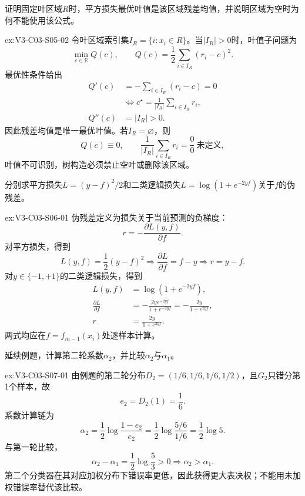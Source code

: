 \begin{SLChapterExercisePairSection}
\begin{exercise}\label{ex:V3-C03-S05-02}
证明固定叶区域$R$时，平方损失最优叶值是该区域残差均值，并说明区域为空时为何不能使用该公式。
\end{exercise}
\ifSLFullEdition
{}\label{sol:V3-C03-S05-02}
\begin{chapterexercisesolution}{ex:V3-C03-S05-02}
令叶区域索引集$I_R=\{i:x_i\in R\}$。当$|I_R|>0$时，叶值子问题为
\[
\min_{c\in\mathbb R}Q(c),
\qquad
Q(c)=\frac12\sum_{i\in I_R}(r_i-c)^2.
\]
最优性条件给出
\[
\begin{aligned}
Q'(c)&=-\sum_{i\in I_R}(r_i-c)=0\\
&\Longleftrightarrow
c^\star=\frac1{|I_R|}\sum_{i\in I_R}r_i,\\
Q''(c)&=|I_R|>0.
\end{aligned}
\]
因此残差均值是唯一最优叶值。若$I_R=\varnothing$，则
\[
Q(c)\equiv0,
\qquad
\frac1{|I_R|}\sum_{i\in I_R}r_i=\frac{0}{0}\ \text{未定义},
\]
叶值不可识别，树构造必须禁止空叶或删除该区域。
\end{chapterexercisesolution}
\fi

\begin{exercise}\label{ex:V3-C03-S06-01}
分别求平方损失$L=(y-f)^2/2$和二类逻辑损失$L=\log(1+e^{-2yf})$关于$f$的伪残差。
\end{exercise}
\ifSLFullEdition
{}\label{sol:V3-C03-S06-01}
\begin{chapterexercisesolution}{ex:V3-C03-S06-01}
伪残差定义为损失关于当前预测的负梯度：
\[
r=-\frac{\partial L(y,f)}{\partial f}.
\]
对平方损失，得到
\[
L(y,f)=\frac12(y-f)^2
\Longrightarrow
\frac{\partial L}{\partial f}=f-y
\Longrightarrow
r=y-f.
\]
对$y\in\{-1,+1\}$的二类逻辑损失，得到
\[
\begin{aligned}
L(y,f)&=\log(1+e^{-2yf}),\\
\frac{\partial L}{\partial f}
&=-\frac{2y e^{-2yf}}{1+e^{-2yf}}
=-\frac{2y}{1+e^{2yf}},\\
r&=\frac{2y}{1+e^{2yf}}.
\end{aligned}
\]
两式均应在$f=f_{m-1}(x_i)$处逐样本计算。
\end{chapterexercisesolution}
\fi

\begin{exercise}\label{ex:V3-C03-S07-01}
延续例题，计算第二轮系数$\alpha_2$，并比较$\alpha_2$与$\alpha_1$。
\end{exercise}
\ifSLFullEdition
{}\label{sol:V3-C03-S07-01}
\begin{chapterexercisesolution}{ex:V3-C03-S07-01}
由例题的第二轮分布$D_2=(1/6,1/6,1/6,1/2)$，且$G_2$只错分第1个样本，故
\[
e_2=D_2(1)=\frac16.
\]
系数计算链为
\[
\alpha_2
=\frac12\log\frac{1-e_2}{e_2}
=\frac12\log\frac{5/6}{1/6}
=\frac12\log5.
\]
与第一轮比较，
\[
\alpha_2-\alpha_1
=\frac12\log\frac53>0
\Longrightarrow
\alpha_2>\alpha_1.
\]
第二个分类器在其对应加权分布下错误率更低，因此获得更大表决权；不能用未加权错误率替代该比较。
\end{chapterexercisesolution}
\fi

\end{SLChapterExercisePairSection}
